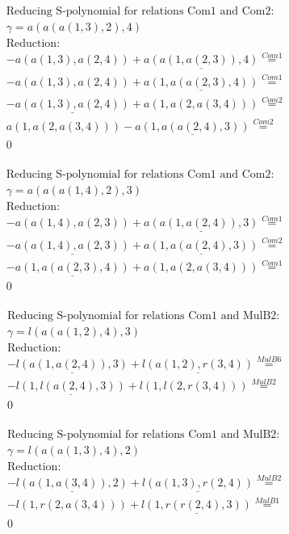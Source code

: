 \documentclass[11pt]{amsart}
\begin{document}
\begin{align*} 
& \text{Reducing S-polynomial for relations Com1 and Com2:} \\ 
& \gamma = a(a(a(1,3),2),4) \\ 
& \text{Reduction}: \\& - a(a(1,3),a(2,4)) + \underline{a(a(1,a(2,3)),4)} \stackrel{ Com1 }{=}  \\ 
& - a(a(1,3),a(2,4)) + \underline{a(1,a(a(2,3),4))} \stackrel{ Com1 }{=}  \\ 
& - \underline{a(a(1,3),a(2,4))} + a(1,a(2,a(3,4))) \stackrel{ Com2 }{=}  \\ 
&a(1,a(2,a(3,4))) - \underline{a(1,a(a(2,4),3))} \stackrel{ Com2 }{=}  \\ 
&0\\ 
\end{align*} 
 
\begin{align*} 
& \text{Reducing S-polynomial for relations Com1 and Com2:} \\ 
& \gamma = a(a(a(1,4),2),3) \\ 
& \text{Reduction}: \\& - a(a(1,4),a(2,3)) + \underline{a(a(1,a(2,4)),3)} \stackrel{ Com1 }{=}  \\ 
& - \underline{a(a(1,4),a(2,3))} + \underline{a(1,a(a(2,4),3))} \stackrel{ Com2 }{=}  \\ 
& - \underline{a(1,a(a(2,3),4))} + a(1,a(2,a(3,4))) \stackrel{ Com1 }{=}  \\ 
&0\\ 
\end{align*} 
 
\begin{align*} 
& \text{Reducing S-polynomial for relations Com1 and MulB2:} \\ 
& \gamma = l(a(a(1,2),4),3) \\ 
& \text{Reduction}: \\& - \underline{l(a(1,a(2,4)),3)} + \underline{l(a(1,2),r(3,4))} \stackrel{ MulB6 }{=}  \\ 
& - \underline{l(1,l(a(2,4),3))} + l(1,l(2,r(3,4))) \stackrel{ MulB2 }{=}  \\ 
&0\\ 
\end{align*} 
 
\begin{align*} 
& \text{Reducing S-polynomial for relations Com1 and MulB2:} \\ 
& \gamma = l(a(a(1,3),4),2) \\ 
& \text{Reduction}: \\& - \underline{l(a(1,a(3,4)),2)} + \underline{l(a(1,3),r(2,4))} \stackrel{ MulB2 }{=}  \\ 
& - l(1,r(2,a(3,4))) + \underline{l(1,r(r(2,4),3))} \stackrel{ MulB1 }{=}  \\ 
&0\\ 
\end{align*} 
 
\end{document}
